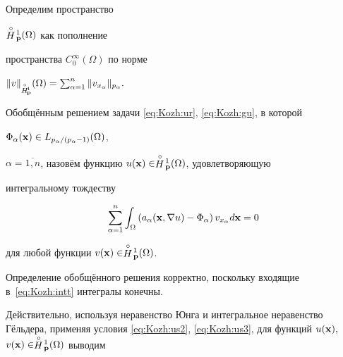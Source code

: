 \smallskip



 Определим пространство

$\stackrel{\circ}{H}\!{}^1_{\bf p}(\Omega)$ как пополнение

пространства $C_0^\infty (\Omega)$ по норме

$\|v\|_{\stackrel{\circ}{H}\!{}^1_{\bf

p}}(\Omega)=\sum_{\alpha=1}^n

\|v_{x_{\alpha}}\|_{p_{\alpha}}.$



\smallskip



\begin{definition}

Обобщённым решением задачи \eqref{eq:Kozh:ur}, \eqref{eq:Kozh:gu}, в которой 

$\Phi_\alpha({\bf x}) \in L_{p_\alpha/(p_\alpha-1)}(\Omega)$,

$\alpha=\overline{1,n}$, назовём функцию $u({\bf x}) \in \stackrel {\circ} {H}\!{}^1_{{\bf p}} (\Omega)$, удовлетворяющую

интегральному тождеству

\begin{equation}

\sum\limits_{\alpha=1}^{n}\int _{\Omega}\left(a_{\alpha}({\bf

x},\nabla u)-\Phi_\alpha\right)v_{x_{\alpha}}d{\bf x}=0\label{eq:Kozh:intt}

\end{equation}

для любой функции $v({\bf x}) \in \stackrel {\circ} {H}\!{}^1_{\bf

p}(\Omega)$.

\end{definition}



\smallskip



Определение обобщённого решения корректно, поскольку входящие в~\eqref{eq:Kozh:intt} интегралы конечны. 

Действительно, используя неравенство Юнга и интегральное неравенство Гёльдера, применяя условия \eqref{eq:Kozh:us2}, \eqref{eq:Kozh:us3}, для функций $u({\bf x}),$ $v({\bf x})\in \stackrel {\circ} {H}\!{}^1_{\bf

p}(\Omega)$ выводим

$$


